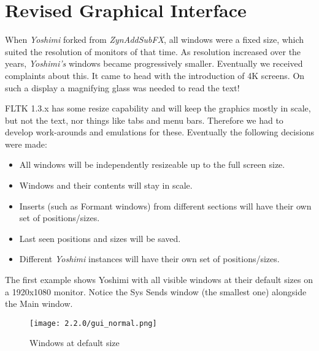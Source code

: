 %
%
%

\section{Revised Graphical Interface}
\label{sec:revised_interface}
   When \textsl{Yoshimi} forked from \textsl{ZynAddSubFX}, all windows were
   a fixed size, which suited the resolution of monitors of that time.
   As resolution increased over the years,
   \textsl{Yoshimi's} windows became progressively smaller.
   Eventually we received complaints about this.
   It came to head with the introduction of 4K
   screens. On such a display a magnifying glass was needed to read the text!

   FLTK 1.3.x has some resize capability and will keep the graphics mostly in
   scale, but not the text, nor things like tabs and menu bars. Therefore we had
   to develop work-arounds and emulations for these. Eventually the following
   decisions were made:

   \begin{itemize}
      \item All windows will be independently resizeable up to the full
         screen size.
      \item Windows and their contents will stay in scale.
      \item Inserts (such as Formant windows) from different sections will have
         their own set of positions/sizes.
      \item Last seen positions and sizes will be saved.
      \item Different \textsl{Yoshimi} instances will have their own set of
         positions/sizes.
   \end{itemize}

\pagebreak
   The first example shows Yoshimi with all visible windows at their default sizes
   on a 1920x1080 monitor. Notice the Sys Sends window (the smallest one)
   alongside the Main window.

   \begin{figure}[H]
      \centering
      \texttt{[image: 2.2.0/gui\_normal.png]}
      \caption{Windows at default size}
      \label{fig:default_size_windows}
   \end{figure}

